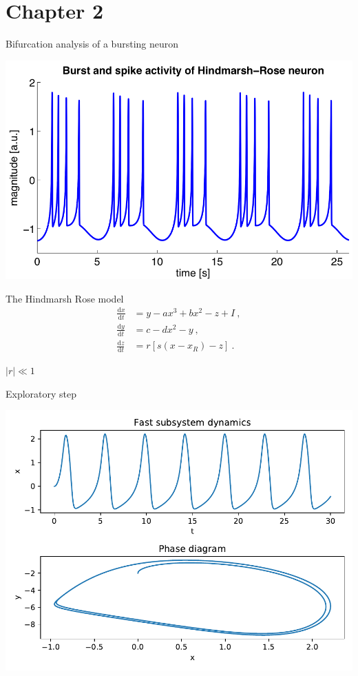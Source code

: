 \documentclass[presentation]{beamer}
\begin{document}
\section{Chapter 2}
\label{sec:org084ec99}
\begin{frame}[label={sec:org476dbea}]{Bifurcation analysis of a bursting neuron}
\begin{center}
\includegraphics[height=.85\textheight]{./wikipedia_HR.png}
\end{center}
\end{frame}
\begin{frame}[label={sec:org02f14f4}]{The Hindmarsh Rose model}
\begin{align}
\frac{\mathrm{d} x}{\mathrm{d} t} &= y - ax^3 +bx^2 -z + I~,\\ \nonumber
\frac{\mathrm{d} y}{\mathrm{d} t} &= c- dx^2 -y~,\\ 
\frac{\mathrm{d} z}{\mathrm{d} t} &= r\left[s(x-x_R)-z\right]~.\nonumber
\end{align}

\vfill

\begin{center}
\(|r| \ll 1\)
\end{center}
\end{frame}
\begin{frame}[label={sec:orgd8703ec}]{Exploratory step}
\begin{center}
\includegraphics[height=.85\textheight]{./trajectory.pdf}
\end{center}
\end{frame}
\end{document}
